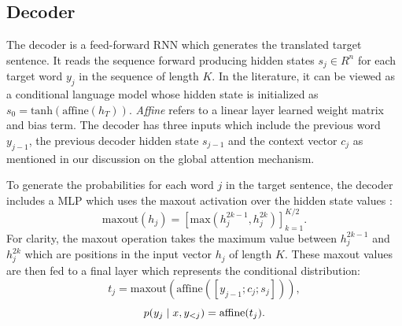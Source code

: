  




\subsection{Decoder}


The decoder is a feed-forward \ac{RNN} which generates the translated target sentence. It reads the sequence forward producing hidden states $s_{j} \in R^{n}$ for each target word $y_{j}$ in the sequence of length $K$. In the literature, it can be viewed as a conditional language model \cite{koehn2017NMT} whose hidden state is initialized as $s_{0} = \text{tanh}(\text{affine}(h_{T}))$. \textit{Affine} refers to a linear layer learned weight matrix and bias term. The decoder has three inputs which include the previous word $y_{j-1}$, the previous decoder hidden state $s_{j-1}$ and the context vector $c_{j}$ as mentioned in our discussion on the global attention mechanism. 


To generate the probabilities for each word $j$ in the target sentence, the decoder includes a \ac{MLP} which uses the maxout activation over the hidden state values \cite{goodfellow2013maxout}:
\begin{equation}
\text{maxout}(h_{j}) = [\text{max}(h_{j}^{2k -1}, h_{j}^{2k})]_{k=1}^{K / 2}.
\end{equation}
For clarity, the maxout operation takes the maximum value between $h_{j}^{2k -1}$ and $h_{j}^{2k}$ which are positions in the input vector $h_{j}$ of length $K$. These maxout values are then fed to a final layer which represents the conditional distribution:
\begin{equation}
	t_{j} = \text{maxout}(\text{affine}([y_{j-1}; c_{j}; s_{j} ])),
\end{equation}
\begin{equation}
p(y_{j} \; | \;{x, y_{<j}}) = \text{affine}(t_{j}).
\end{equation}


